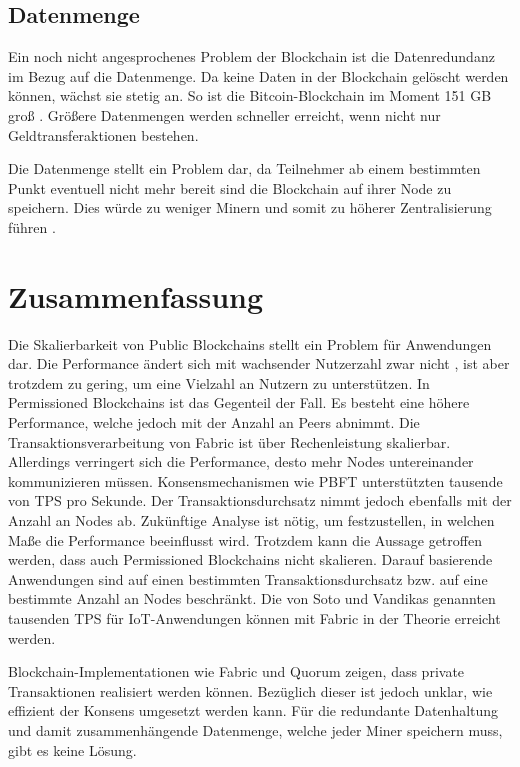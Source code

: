 \subsection{Datenmenge}
Ein noch nicht angesprochenes Problem der Blockchain ist die Datenredundanz im Bezug auf die Datenmenge. Da keine Daten in der Blockchain gelöscht werden können, wächst sie stetig an. So ist die Bitcoin-Blockchain im Moment 151 GB groß \cite{BlockchainUnternehmenBlockchainSizeBitcoin}. Größere Datenmengen werden schneller erreicht, wenn nicht nur Geldtransferaktionen bestehen.

Die Datenmenge stellt ein Problem dar, da Teilnehmer ab einem bestimmten Punkt eventuell nicht mehr bereit sind die Blockchain auf ihrer Node zu speichern. Dies würde zu weniger Minern und somit zu höherer Zentralisierung führen \cite{SchererPerformanceScalabilityBlockchain2017}.

\section{Zusammenfassung}
Die Skalierbarkeit von Public Blockchains stellt ein Problem für Anwendungen dar. Die Performance ändert sich mit wachsender Nutzerzahl zwar nicht \cite{SchererPerformanceScalabilityBlockchain2017}, ist aber trotzdem zu gering, um eine Vielzahl an Nutzern zu unterstützen. In Permissioned Blockchains ist das Gegenteil der Fall. Es besteht eine höhere Performance, welche jedoch mit der Anzahl an Peers abnimmt. Die Transaktionsverarbeitung von Fabric ist über Rechenleistung skalierbar. Allerdings verringert sich die Performance, desto mehr Nodes untereinander kommunizieren müssen. Konsensmechanismen wie \acs{PBFT} unterstützten tausende von \acs{TPS} pro Sekunde. Der Transaktionsdurchsatz nimmt jedoch ebenfalls mit der Anzahl an Nodes ab. Zukünftige Analyse ist nötig, um festzustellen, in welchen Maße die Performance beeinflusst wird. Trotzdem kann die Aussage getroffen werden, dass auch Permissioned Blockchains nicht skalieren. Darauf basierende Anwendungen sind auf einen bestimmten Transaktionsdurchsatz bzw. auf eine bestimmte Anzahl an Nodes beschränkt. Die von Soto und Vandikas genannten tausenden \acs{TPS} für IoT-Anwendungen können mit Fabric in der Theorie erreicht werden. 

Blockchain-Implementationen wie Fabric und Quorum zeigen, dass private Transaktionen realisiert werden können. Bezüglich dieser ist jedoch unklar, wie effizient der Konsens umgesetzt werden kann. Für die redundante Datenhaltung und damit zusammenhängende Datenmenge, welche jeder Miner speichern muss, gibt es keine Lösung.





